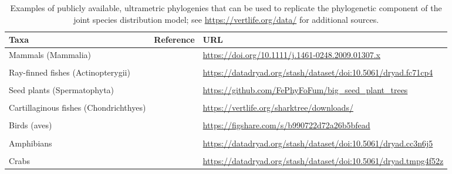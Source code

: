 \begin{table}
  \caption[List of public ultrametric phylogenies]{Examples of publicly available, ultrametric phylogenies that can be used to replicate the phylogenetic component of the joint species distribution model;  see \url{https://vertlife.org/data/} for additional sources.}
\begin{center}
\begin{tabularx}{\textwidth}{ | X m{0.5in} m{3in} | } 
  \hline
  Taxa & Reference & URL \\ 
  \hline

  Mammals (Mammalia) & \cite{fritz_geographical_2009} & \url{https://doi.org/10.1111/j.1461-0248.2009.01307.x} \\ & & \\ 
  
  Ray-finned fishes (Actinopterygii) & \cite{rabosky_inverse_2018} & \url{https://datadryad.org/stash/dataset/doi:10.5061/dryad.fc71cp4} \\ & & \\ 
  
  Seed plants (Spermatophyta) & \cite{smith_constructing_2018} & \url{https://github.com/FePhyFoFum/big_seed_plant_trees} \\ & & \\ 
  
  Cartillaginous fishes (Chondrichthyes) & \cite{stein_global_2018} & \url{https://vertlife.org/sharktree/downloads/} \\ & & \\
  
  Birds (aves) & \cite{tobias_avonet_2022} & \url{https://figshare.com/s/b990722d72a26b5bfead} \\ & & \\

  Amphibians & \cite{jetz_interplay_2018} & \url{https://datadryad.org/stash/dataset/doi:10.5061/dryad.cc3n6j5} \\ & & \\

  Crabs & \cite{wolfe_convergent_2022} & \url{https://datadryad.org/stash/dataset/doi:10.5061/dryad.tmpg4f52z} \\

  \hline
\end{tabularx}
  \label{tab:Chap11_phylogenies}
\end{center}
\end{table}

